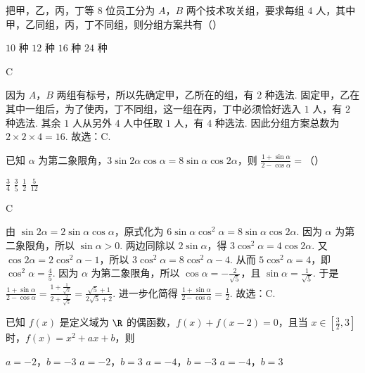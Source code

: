\documentclass[UTF8,a4paper,oneside,11pt]{ctexbook}
\begin{document}
\begin{problem}
把甲，乙，丙，丁等 \(8\) 位员工分为 \(A\)，\(B\) 两个技术攻关组，要求每组 \(4\) 人，其中甲，乙同组，丙，丁不同组，则分组方案共有（\quad）

\choices
    {\(10\) 种}
    {\(12\) 种}
    {\(16\) 种}
    {\(24\) 种}
\end{problem}

\begin{answer}
C
\end{answer}

\begin{solution}
因为 \(A\)，\(B\) 两组有标号，所以先确定甲，乙所在的组，有 \(2\) 种选法.
固定甲，乙在其中一组后，为了使丙，丁不同组，这一组在丙，丁中必须恰好选入 \(1\) 人，有 \(2\) 种选法. 其余 \(1\) 人从另外 \(4\) 人中任取 \(1\) 人，有 \(4\) 种选法.
因此分组方案总数为 \(2\times 2\times 4=16\). 故选：C.
\end{solution}

\begin{problem}
已知 \(\alpha\) 为第二象限角，\(3\sin 2\alpha \cos \alpha=8\sin \alpha \cos 2\alpha\)，则 \(\frac{1+\sin \alpha}{2-\cos \alpha}=\)（\quad）

\choices
    {\(\frac{3}{4}\)}
    {\(\frac{3}{5}\)}
    {\(\frac{1}{2}\)}
    {\(\frac{5}{12}\)}
\end{problem}

\begin{answer}
C
\end{answer}

\begin{solution}
由 \(\sin 2\alpha=2\sin \alpha \cos \alpha\)，原式化为 \(6\sin \alpha \cos^2 \alpha=8\sin \alpha \cos 2\alpha\). 因为 \(\alpha\) 为第二象限角，所以 \(\sin \alpha>0\). 两边同除以 \(2\sin \alpha\)，得 \(3\cos^2 \alpha=4\cos 2\alpha\). 又 \(\cos 2\alpha=2\cos^2 \alpha-1\)，所以 \(3\cos^2 \alpha=8\cos^2 \alpha-4\). 从而 \(5\cos^2 \alpha=4\)，即 \(\cos^2 \alpha=\frac{4}{5}\). 因为 \(\alpha\) 为第二象限角，所以 \(\cos \alpha=-\frac{2}{\sqrt{5}}\)，且 \(\sin \alpha=\frac{1}{\sqrt{5}}\). 于是 \(\frac{1+\sin \alpha}{2-\cos \alpha}=\frac{1+\frac{1}{\sqrt{5}}}{2+\frac{2}{\sqrt{5}}}=\frac{\sqrt{5}+1}{2\sqrt{5}+2}\). 进一步化简得 \(\frac{1+\sin \alpha}{2-\cos \alpha}=\frac{1}{2}\).
故选：C.
\end{solution}

\begin{problem}
已知 \(f\left( x \right)\) 是定义域为 \(\R\) 的偶函数，\(f\left( x \right)+f\left( x-2 \right)=0\)，且当 \(x\in \left[ \frac{3}{2},3 \right]\) 时，\(f\left( x \right)=x^2+ax+b\)，则

\choices
    {\(a=-2\)，\(b=-3\)}
    {\(a=-2\)，\(b=3\)}
    {\(a=-4\)，\(b=-3\)}
    {\(a=-4\)，\(b=3\)}
\end{problem}
\end{document}
